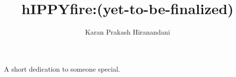 \documentclass[12pt]{report}
\author{Karan Prakash Hiranandani}                        %
\title{hIPPYfire:(yet-to-be-finalized)}      %
\begin{document}

\copyrightpage

\commcertpage
\titlepage


\begin{dedication} %
A short dedication to someone special.
\end{dedication}

\begin{acknowledgments} %

\end{acknowledgments}

\utabstract %
\indent



\tableofcontents
\listoffigures






% 

% 



% 

% 






%
\end{document}
